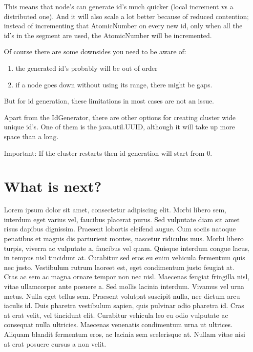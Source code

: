 This means that node's can generate id's much quicker (local increment vs a distributed one). And it will also scale a lot better because of reduced contention; instead of incrementing that AtomicNumber on every new id, only when all the id's in the segment are used, the AtomicNumber will be incremented.

Of course there are some downsides you need to be aware of:
\begin{enumerate}
\item the generated id's probably will be out of order
\item if a node goes down without using its range, there might be gaps.
\end{enumerate}
But for id generation, these limitations in most cases are not an issue.

Apart from the IdGenerator, there are other options for creating cluster wide unique id's. One of them is the java.util.UUID, although it will take up more space than a long. 

Important: If the cluster restarts then id generation will start from 0.

\section{What is next?}
Lorem ipsum dolor sit amet, consectetur adipiscing elit. Morbi libero sem,
interdum eget varius vel, faucibus placerat purus. Sed vulputate diam sit amet
risus dapibus dignissim. Praesent lobortis eleifend augue. Cum sociis natoque
penatibus et magnis dis parturient montes, nascetur ridiculus mus. Morbi libero
turpis, viverra ac vulputate a, faucibus vel quam. Quisque interdum congue
lacus, in tempus nisl tincidunt at. Curabitur sed eros eu enim vehicula
fermentum quis nec justo. Vestibulum rutrum laoreet est, eget condimentum justo
feugiat at. Cras ac sem ac magna ornare tempor non nec nisl. Maecenas feugiat
fringilla nisl, vitae ullamcorper ante posuere a. Sed mollis lacinia interdum.
Vivamus vel urna metus. Nulla eget tellus sem. Praesent volutpat suscipit nulla,
nec dictum arcu iaculis id. Duis pharetra vestibulum sapien, quis pulvinar odio
pharetra id. Cras at erat velit, vel tincidunt elit. Curabitur vehicula leo eu
odio vulputate ac consequat nulla ultricies. Maecenas venenatis condimentum
urna ut ultrices. Aliquam blandit fermentum eros, ac lacinia sem scelerisque
at. Nullam vitae nisi at erat posuere cursus a non velit.
